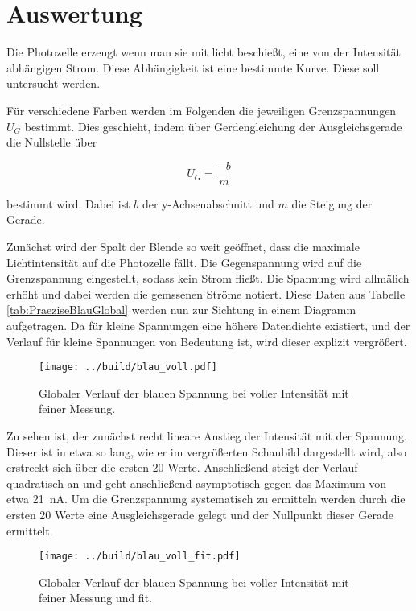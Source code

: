 


\section{Auswertung}
\label{sec:Auswertung}

Die Photozelle erzeugt wenn man  sie mit licht beschießt, eine von der Intensität abhängigen Strom. Diese Abhängigkeit ist 
eine bestimmte Kurve. Diese soll untersucht werden.

Für verschiedene Farben werden im Folgenden die jeweiligen Grenzspannungen $U_G$ bestimmt. Dies geschieht, indem über Gerdengleichung 
der Ausgleichsgerade die Nullstelle über 

\begin{equation}
    U_G=\frac{-b}{m}
    \label{eqn:Nullstelle}
\end{equation}

\noindent bestimmt wird. Dabei ist $b$ der y-Achsenabschnitt und $m$ die Steigung der Gerade.

Zunächst wird der Spalt der Blende so weit geöffnet, dass die maximale Lichtintensität auf die Photozelle fällt. Die Gegenspannung 
wird auf die Grenzspannung eingestellt, sodass kein Strom fließt. Die Spannung wird allmälich erhöht und dabei werden die gemssenen 
Ströme notiert. Diese Daten aus Tabelle \ref{tab:PraeziseBlauGlobal} werden nun zur Sichtung in einem Diagramm aufgetragen. Da für 
kleine Spannungen eine höhere Datendichte existiert, und der Verlauf für kleine Spannungen von Bedeutung ist, wird dieser explizit 
vergrößert. 

\begin{figure}[H]
    \centering
    \texttt{[image: ../build/blau\_voll.pdf]}
    \caption{Globaler Verlauf der blauen Spannung bei voller Intensität mit feiner Messung.}
\end{figure}

\noindent Zu sehen ist, der zunächst recht lineare Anstieg der Intensität mit der Spannung. Dieser ist in etwa so lang, wie er im 
vergrößerten Schaubild dargestellt wird, also erstreckt sich über die ersten 20 Werte. Anschließend steigt der Verlauf quadratisch 
an und geht anschließend asymptotisch gegen das Maximum von etwa \qty{21}{\nano\ampere}. Um die Grenzspannung systematisch zu 
ermitteln werden durch die ersten 20 Werte eine Ausgleichsgerade gelegt und der Nullpunkt dieser Gerade ermittelt. 

\begin{figure}[H]
    \centering
    \texttt{[image: ../build/blau\_voll\_fit.pdf]}
    \caption{Globaler Verlauf der blauen Spannung bei voller Intensität mit feiner Messung und fit.}
\end{figure}

